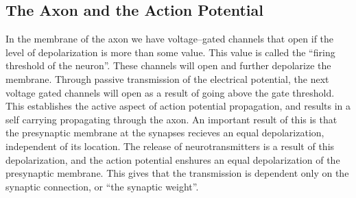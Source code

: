\subsection{The Axon and the Action Potential}
\label{ssecTheActionPotential}
In the membrane of the axon we have voltage--gated channels that open if the level of depolarization is more than some value. This value is called the ``firing threshold of the neuron''.
These channels will open and further depolarize the membrane. 
Through passive transmission of the electrical potential, the next voltage gated channels will open as a result of going above the gate threshold. %
This establishes the active aspect of action potential propagation, and results in a self carrying propagating through the axon.
An important result of this is that the presynaptic membrane at the synapses recieves an equal depolarization, independent of its location. 
The release of neurotransmitters is a result of this depolarization, and the action potential enshures an equal depolarization of the presynaptic membrane.
This gives that the transmission is dependent only on the synaptic connection, or ``the synaptic weight''\cite{PrinciplesOfNeuralScience4edKAP09}.
%

